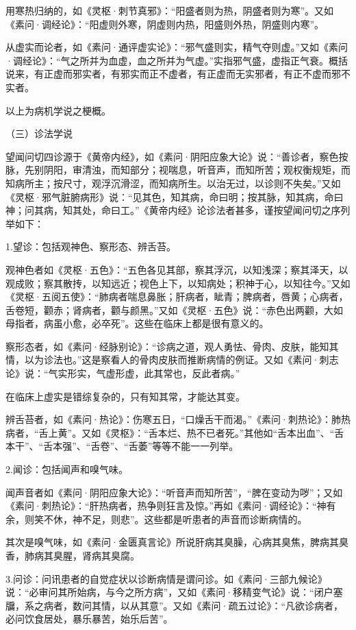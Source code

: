 \documentclass[a4paper,12pt,UTF8,twoside]{ctexbook}
\begin{document}
	用寒热归纳的，如《灵枢·刺节真邪》：“阳盛者则为热，阴盛者则为寒”。又如《素问·调经论》：“阳虚则外寒，阴虚则内热，阳盛则外热，阴盛则内寒”。
	
	从虚实而论者，如《素问·通评虚实论》：“邪气盛则实，精气夺则虚。”又如《素问·调经论》：“气之所并为血虚，血之所并为气虚。”实指邪气盛，虚指正气衰。概括说来，有正虚而邪实者，有邪实而正不虚者，有正虚而无实邪者，有正不虚而邪不实者。
	
	以上为病机学说之梗概。
	
	（三）诊法学说
	
	望闻问切四诊源于《黄帝内经》，如《素问·阴阳应象大论》说：“善诊者，察色按脉，先别阴阳，审清浊，而知部分；视喘息，听音声，而知所苦；观权衡规矩，而知病所主；按尺寸，观浮沉滑涩，而知病所生。以治无过，以诊则不失矣。”又如《灵枢·邪气脏腑病形》说：“见其色，知其病，命曰明；按其脉，知其病，命曰神；问其病，知其处，命曰工。”《黄帝内经》论诊法者甚多，谨按望闻问切之序列举如下：
	
	1.望诊：包括观神色、察形态、辨舌苔。
	
	观神色者如《灵枢·五色》：“五色各见其部，察其浮沉，以知浅深；察其泽天，以观成败；察其散抟，以知远近；视色上下，以知病处；积神于心，以知往今。”又如《灵枢·五阅五使》：“肺病者喘息鼻胀；肝病者，眦青；脾病者，唇黄；心病者，舌卷短，颧赤；肾病者，颧与颜黑。”又如《灵枢·五色》说：“赤色出两颧，大如母指者，病虽小愈，必卒死”。这些在临床上都是很有意义的。
	
	察形态者，如《素问·经脉别论》：“诊病之道，观人勇怯、骨肉、皮肤，能知其情，以为诊法也。”这是察看人的骨肉皮肤而推断病情的例证。又如《素问·刺志论》说：“气实形实，气虚形虚，此其常也，反此者病。”
	
	在临床上虚实是错综复杂的，只有知其常，才能达其变。
	
	辨舌苔者，如《素问·热论》：伤寒五日，“口燥舌干而渴。”《素问·刺热论》：肺热病者，“舌上黄”。又如《灵枢》：“舌本烂、热不已者死。”其他如“舌本出血”、“舌本干”、“舌本强”、“舌卷”、“舌萎”等等不能一一列举。
	
	2.闻诊：包括闻声和嗅气味。
	
	闻声音者如《素问·阴阳应象大论》：“听音声而知所苦”，“脾在变动为哕”；又如《素问·刺热论》：“肝热病者，热争则狂言及惊。”再如《素问·调经论》：“神有余，则笑不休，神不足，则悲”。这些都是听患者的声音而诊断病情的。
	
	其次是嗅气味，如《素问·金匮真言论》所说肝病其臭臊，心病其臭焦，脾病其臭香，肺病其臭腥，肾病其臭腐。
	
	3.问诊：问讯患者的自觉症状以诊断病情是谓问诊。如《素问·三部九候论》说：“必审问其所始病，与今之所方病”，又如《素问·移精变气论》说：“闭户塞牖，系之病者，数问其情，以从其意”。又如《素问·疏五过论》：“凡欲诊病者，必问饮食居处，暴乐暴苦，始乐后苦”。
	
\end{document}
